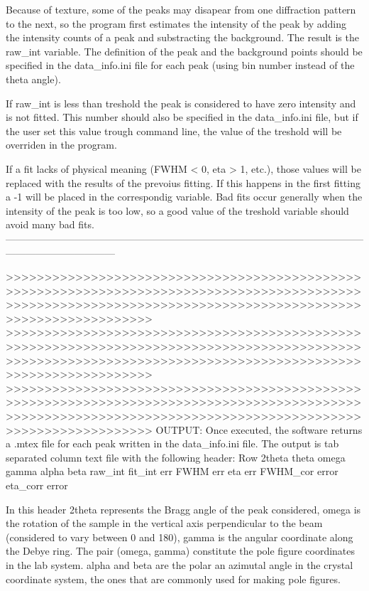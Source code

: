 Because of texture, some of the peaks may disapear from one diffraction pattern to the next, so the program first estimates the intensity of the peak by adding 
the intensity counts of a peak and substracting the background. The result is the raw_int variable. The definition of the peak and the background points should 
be specified in the data_info.ini file for each peak (using bin number instead of the theta angle).

If raw_int is less than treshold the peak is considered to have zero intensity and is not fitted. This number should also be specified in the data_info.ini file,
but if the user set this value trough command line, the value of the treshold will be overriden in the program.

If a fit lacks of physical meaning (FWHM < 0, eta > 1, etc.), those values will be replaced with the results of the prevoius fitting. If this happens in the first
fitting a -1 will be placed in the correspondig variable. Bad fits occur generally when the intensity of the peak is too low, so a good value of the treshold 
variable should avoid many bad fits.
---------------------------------------------------------------------------------------------------------------------------------------------

>>>>>>>>>>>>>>>>>>>>>>>>>>>>>>>>>>>>>>>>>>>>>>>>>>>>>>>>>>>>>>>>>>>>>>>>>>>>>>>>>>>>>>>>>>>>>>>>>>>>>>>>>>>>>>>>>>>>>>>>>>>>>>>>>>>>>>>>>>>>>>>>>>>>>>>>>>>>>
>>>>>>>>>>>>>>>>>>>>>>>>>>>>>>>>>>>>>>>>>>>>>>>>>>>>>>>>>>>>>>>>>>>>>>>>>>>>>>>>>>>>>>>>>>>>>>>>>>>>>>>>>>>>>>>>>>>>>>>>>>>>>>>>>>>>>>>>>>>>>>>>>>>>>>>>>>>>>
>>>>>>>>>>>>>>>>>>>>>>>>>>>>>>>>>>>>>>>>>>>>>>>>>>>>>>>>>>>>>>>>>>>>>>>>>>>>>>>>>>>>>>>>>>>>>>>>>>>>>>>>>>>>>>>>>>>>>>>>>>>>>>>>>>>>>>>>>>>>>>>>>>>>>>>>>>>>>
OUTPUT:
Once executed, the software returns a .mtex file for each peak written in the data_info.ini file. The output is tab separated column text file with the following
header:
Row 2theta theta  omega gamma alpha  beta raw_int fit_int  err FWHM err eta err FWHM_cor error eta_corr error

In this header 2theta represents the Bragg angle of the peak considered, omega is the rotation of the sample in the vertical axis perpendicular to the beam 
(considered to vary between 0 and 180), gamma is the angular coordinate along the Debye ring. The pair (omega, gamma) constitute the pole figure coordinates in 
the lab system. alpha and beta are the polar an azimutal angle in the crystal coordinate system, the ones that are commonly used for making pole figures.

